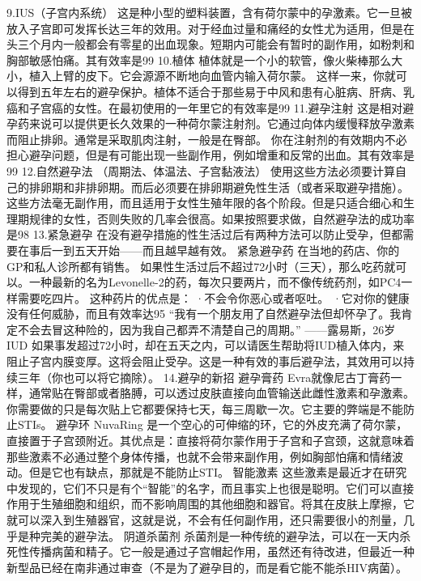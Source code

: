 \documentclass[12pt,UTF8]{ctexbook}
\begin{document}
9.IUS（子宫内系统）
这是种小型的塑料装置，含有荷尔蒙中的孕激素。它一旦被放入子宫即可发挥长达三年的效用。对于经血过量和痛经的女性尤为适用，但是在头三个月内一般都会有零星的出血现象。短期内可能会有暂时的副作用，如粉刺和胸部敏感怕痛。其有效率是99%
10.植体
植体就是一个小的软管，像火柴棒那么大小，植入上臂的皮下。它会源源不断地向血管内输入荷尔蒙。
这样一来，你就可以得到五年左右的避孕保护。植体不适合于那些易于中风和患有心脏病、肝病、乳癌和子宫癌的女性。在最初使用的一年里它的有效率是99%
11.避孕注射
这是相对避孕药来说可以提供更长久效果的一种荷尔蒙注射剂。它通过向体内缓慢释放孕激素而阻止排卵。通常是采取肌肉注射，一般是在臀部。
你在注射剂的有效期内不必担心避孕问题，但是有可能出现一些副作用，例如增重和反常的出血。其有效率是99%
12.自然避孕法
（周期法、体温法、子宫黏液法）
使用这些方法必须要计算自己的排卵期和非排卵期。而后必须要在排卵期避免性生活（或者采取避孕措施）。这些方法毫无副作用，而且适用于女性生殖年限的各个阶段。但是只适合细心和生理期规律的女性，否则失败的几率会很高。如果按照要求做，自然避孕法的成功率是98%
13.紧急避孕
在没有避孕措施的性生活过后有两种方法可以防止受孕，但都需要在事后一到五天开始——而且越早越有效。
紧急避孕药
在当地的药店、你的GP和私人诊所都有销售。
如果性生活过后不超过72小时（三天），那么吃药就可以。一种最新的名为Levonelle-2的药，每次只要两片，而不像传统药剂，如PC4一样需要吃四片。
这种药片的优点是：
·不会令你恶心或者呕吐。
·它对你的健康没有任何威胁，而且有效率达95%
“我有一个朋友用了自然避孕法但却怀孕了。我肯定不会去冒这种险的，因为我自己都弄不清楚自己的周期。”
——露易斯，26岁
IUD
如果事发超过72小时，却在五天之内，可以请医生帮助将IUD植入体内，来阻止子宫内膜变厚。这将会阻止受孕。这是一种有效的事后避孕法，其效用可以持续三年（你也可以将它摘除）。
14.避孕的新招
避孕膏药
Evra就像尼古丁膏药一样，通常贴在臀部或者胳膊，可以透过皮肤直接向血管输送此雌性激素和孕激素。
你需要做的只是每次贴上它都要保持七天，每三周歇一次。它主要的弊端是不能防止STIs。
避孕环
NuvaRing 是一个空心的可伸缩的环，它的外皮充满了荷尔蒙，直接置于子宫颈附近。其优点是：直接将荷尔蒙作用于子宫和子宫颈，这就意味着那些激素不必通过整个身体传播，也就不会带来副作用，例如胸部怕痛和情绪波动。但是它也有缺点，那就是不能防止STI。
智能激素
这些激素是最近才在研究中发现的，它们不只是有个“智能”的名字，而且事实上也很是聪明。它们可以直接作用于生殖细胞和组织，而不影响周围的其他细胞和器官。将其在皮肤上摩擦，它就可以深入到生殖器官，这就是说，不会有任何副作用，还只需要很小的剂量，几乎是种完美的避孕法。
阴道杀菌剂
杀菌剂是一种传统的避孕法，可以在一天内杀死性传播病菌和精子。它一般是通过子宫帽起作用，虽然还有待改进，但最近一种新型品已经在南非通过审查（不是为了避孕目的，而是看它能不能杀HIV病菌）。
\end{document}

